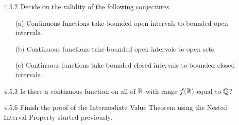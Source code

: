 \documentclass[12pt,letterpaper]{article}
\begin{document}
\begin{itemize}[leftmargin=!,labelindent=5pt]
\begin{proof}
                Next, we need to show that if $g^{-1}(O)$ is open whenever $O \subseteq \bbR$ is an open set, then $g$ is continuous -- that is given an arbitrary point $c \in \bbR$, for all $V_\epsilon(g(c))$ there exists a $V_\delta(c)$ such that $x \in V_\delta(c)$ implies $g(x) \in V_\epsilon(g(c))$.
                Choose an arbitrary point $c \in \bbR$ and $\epsilon > 0$. 
                Let $O$ be the open set given by $V_\epsilon(g(c))$.
                This means that $g^{-1}(O)$ is open -- that is, there exists a $\delta > 0$ such that $V_\delta(c) \subseteq g^{-1}(O)$.
                Choose such a $\delta$.
                Then, for all $x \in V_\delta(c)$, $g(x) \in O$ which means $g(x) \in V_\epsilon(g(c))$ as desired.
                Thus, $g$ is continuous by Theorem 4.3.2 (iii) (Characterizations of Continuity).

            \end{proof}
        \item [4.5.2] Decide on the validity of the following conjectures.
            \begin{itemize}
                \item [(a)] Continuous functions take bounded open intervals to bounded open intervals.
                \item [(b)] Continuous functions take bounded open intervals to open sets.
                \item [(c)] Continuous functions take bounded closed intervals to bounded closed intervals.
            \end{itemize}
        \item [4.5.3] Is there a continuous function on all of $\mathbb{R}$ with range $f(\mathbb{R})$ equal to $\mathbb{Q}$?
        \item [4.5.6] Finish the proof of the Intermediate Value Theorem using the Nested Interval Property started previously.
    \end{itemize}
\end{document}
